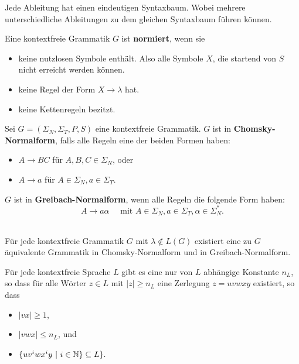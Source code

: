 Jede Ableitung hat einen eindeutigen Syntaxbaum. Wobei mehrere unterschiedliche Ableitungen zu dem gleichen Syntaxbaum führen können.

\begin{definition}
Eine kontextfreie Grammatik \(G\) ist \textbf{normiert}, wenn sie
\begin{itemize}
  \item keine nutzlosen Symbole enthält. Also alle Symbole \(X\), die startend von \(S\) nicht erreicht werden können.
  \item keine Regel der Form \(X \to \lambda\) hat.
  \item keine Kettenregeln bezitzt.\\
\end{itemize}
\end{definition}

\begin{definition}
Sei \(G = (\Sigma_N, \Sigma_T, P, S)\) eine kontextfreie Grammatik. \(G\) ist in \textbf{Chomsky-Normalform}, falls alle Regeln eine der beiden Formen haben:
\begin{itemize}
  \item \(A \to BC\) für \(A, B, C \in \Sigma_N\), oder
  \item \(A \to a\) für \(A \in \Sigma_N, a \in \Sigma_T\).\\
\end{itemize}
\end{definition}

\begin{definition}
\(G\) ist in \textbf{Greibach-Normalform}, wenn alle Regeln die folgende Form haben:
\[
A \to a \alpha \quad \text{ mit } A \in \Sigma_N, a \in \Sigma_T, \alpha \in \Sigma_N^*.
\]\\
\end{definition}

\begin{satz}
Für jede kontextfreie Grammatik \(G\) mit \(\lambda \notin L(G)\) existiert eine zu \(G\) äquivalente Grammatik in Chomsky-Normalform und in Greibach-Normalform.\\
\end{satz}

\begin{lemma}
Für jede kontextfreie Sprache \(L\) gibt es eine nur von \(L\) abhängige Konstante \(n_L\), so dass für alle Wörter \(z \in L\) mit \(|z| \geq n_L\) eine Zerlegung \(z = uvwxy\) existiert, so dass
\begin{itemize}
  \item \(|vx| \geq 1\),
  \item \(|vwx| \leq n_L\), und
  \item \(\{uv^iwx^iy \ |\ i \in \mathbb{N}\} \subseteq L\}.\)\\
\end{itemize}
\end{lemma}

